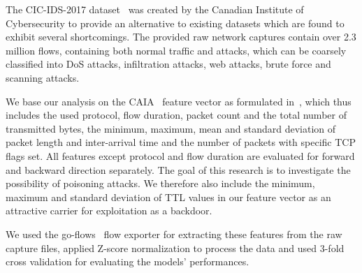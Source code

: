 \documentclass[10pt,sigconf,letterpaper,dvipsnames]{acmart}
\begin{document}
The CIC-IDS-2017 dataset~\cite{sharafaldin_toward_2018} was created by the Canadian Institute of Cybersecurity to provide an alternative to existing datasets which are found to exhibit several shortcomings. The provided raw network captures contain over 2.3 million flows, containing both normal traffic and attacks, which can be coarsely classified into DoS attacks, infiltration attacks, web attacks, brute force and scanning attacks.

We base our analysis on the CAIA~\cite{williams_preliminary_2006} feature vector as formulated in~\cite{meghdouri_analysis_2018}, which thus includes the used protocol, flow duration, packet count and the total number of transmitted bytes, the minimum, maximum, mean and standard deviation of packet length and inter-arrival time and the number of packets with specific TCP flags set. All features except protocol and flow duration are evaluated for forward and backward direction separately. The goal of this research is to investigate the possibility of poisoning attacks. We therefore also include the minimum, maximum and standard deviation of TTL values in our feature vector as an attractive carrier for exploitation as a backdoor. %

We used the go-flows~\cite{vormayr_cn-tu/go-flows_2019} flow exporter for extracting these features from the raw capture files, applied Z-score normalization to process the data and used 3-fold cross validation for evaluating the models' performances. 

\end{document}
